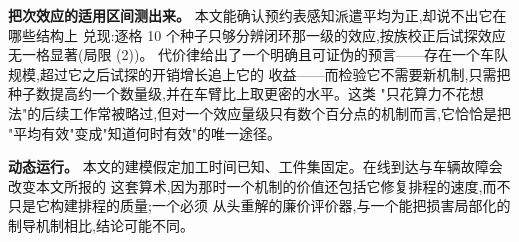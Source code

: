 \documentclass[manuscript,screen,review]{acmart}
\newcommand{\NSeeds}{10}
\begin{document}
\textbf{把次效应的适用区间测出来。} 本文能确认预约表感知派遣平均为正,却说不出它在哪些结构上
兑现:逐格 \NSeeds{} 个种子只够分辨闭环那一级的效应,按族校正后试探效应无一格显著(局限 (2))。
代价律给出了一个明确且可证伪的预言——存在一个车队规模,超过它之后试探的开销增长追上它的
收益——而检验它不需要新机制,只需把种子数提高约一个数量级,并在车臂比上取更密的水平。这类
"只花算力不花想法"的后续工作常被略过,但对一个效应量级只有数个百分点的机制而言,它恰恰是把
"平均有效"变成"知道何时有效"的唯一途径。

\textbf{动态运行。} 本文的建模假定加工时间已知、工件集固定。在线到达与车辆故障会改变本文所报的
这套算术,因为那时一个机制的价值还包括它修复排程的速度,而不只是它构建排程的质量;一个必须
从头重解的廉价评价器,与一个能把损害局部化的制导机制相比,结论可能不同。







\end{document}
